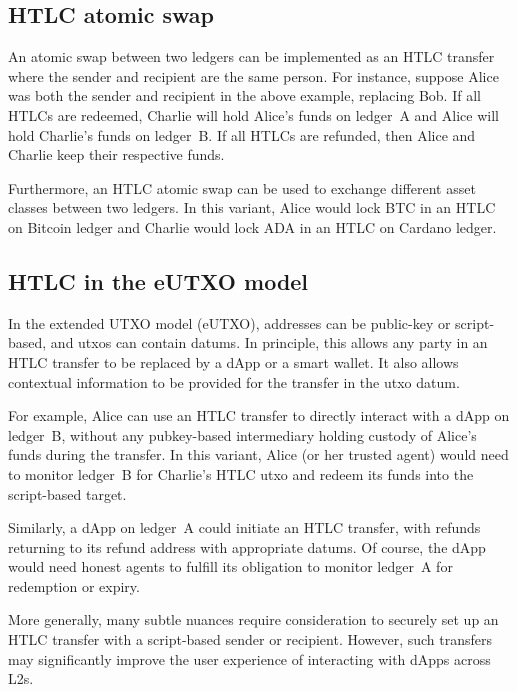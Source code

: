 \documentclass[11pt,a4paper,oneside]{article}
\begin{document}
\begin{multicols}{2}
\subsection{HTLC atomic swap}%
\label{h:htlc-atomic-swap}

An atomic swap between two ledgers can be implemented as an HTLC transfer where the sender and recipient are the same person.
For instance, suppose Alice was both the sender and recipient in the above example, replacing Bob.
If all HTLCs are redeemed, Charlie will hold Alice's funds on ledger~A and Alice will hold Charlie's funds on ledger~B.
If all HTLCs are refunded, then Alice and Charlie keep their respective funds.

Furthermore, an HTLC atomic swap can be used to exchange different asset classes between two ledgers.
In this variant, Alice would lock BTC in an HTLC on Bitcoin ledger and Charlie would lock ADA in an HTLC on Cardano ledger.

\subsection{HTLC in the eUTXO model}%
\label{h:htlc-in-the-eutxo-model}

In the extended UTXO model (eUTXO), addresses can be public-key or script-based, and utxos can contain datums.
In principle, this allows any party in an HTLC transfer to be replaced by a dApp or a smart wallet.
It also allows contextual information to be provided for the transfer in the utxo datum.

For example, Alice can use an HTLC transfer to directly interact with a dApp on ledger~B, without any pubkey-based intermediary holding custody of Alice's funds during the transfer.
In this variant, Alice (or her trusted agent) would need to monitor ledger~B for Charlie's HTLC utxo and redeem its funds into the script-based target.

Similarly, a dApp on ledger~A could initiate an HTLC transfer, with refunds returning to its refund address with appropriate datums.
Of course, the dApp would need honest agents to fulfill its obligation to monitor ledger~A for redemption or expiry.

More generally, many subtle nuances require consideration to securely set up an HTLC transfer with a script-based sender or recipient.
However, such transfers may significantly improve the user experience of interacting with dApps across L2s.


\end{multicols}
\end{document}
